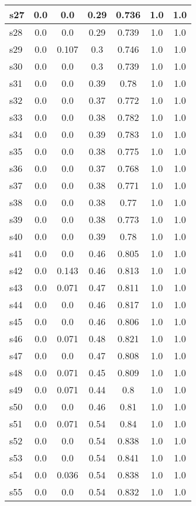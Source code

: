 \documentclass{article}
\begin{document}
\begin{tabular}{|l|c|c|c|c|c|c|}
\hline
s27 &0.0 & 0.0 & 0.29 & 0.736 & 1.0 & 1.0\\
\hline
s28 &0.0 & 0.0 & 0.29 & 0.739 & 1.0 & 1.0\\
\hline
s29 &0.0 & 0.107 & 0.3 & 0.746 & 1.0 & 1.0\\
\hline
s30 &0.0 & 0.0 & 0.3 & 0.739 & 1.0 & 1.0\\
\hline
s31 &0.0 & 0.0 & 0.39 & 0.78 & 1.0 & 1.0\\
\hline
s32 &0.0 & 0.0 & 0.37 & 0.772 & 1.0 & 1.0\\
\hline
s33 &0.0 & 0.0 & 0.38 & 0.782 & 1.0 & 1.0\\
\hline
s34 &0.0 & 0.0 & 0.39 & 0.783 & 1.0 & 1.0\\
\hline
s35 &0.0 & 0.0 & 0.38 & 0.775 & 1.0 & 1.0\\
\hline
s36 &0.0 & 0.0 & 0.37 & 0.768 & 1.0 & 1.0\\
\hline
s37 &0.0 & 0.0 & 0.38 & 0.771 & 1.0 & 1.0\\
\hline
s38 &0.0 & 0.0 & 0.38 & 0.77 & 1.0 & 1.0\\
\hline
s39 &0.0 & 0.0 & 0.38 & 0.773 & 1.0 & 1.0\\
\hline
s40 &0.0 & 0.0 & 0.39 & 0.78 & 1.0 & 1.0\\
\hline
s41 &0.0 & 0.0 & 0.46 & 0.805 & 1.0 & 1.0\\
\hline
s42 &0.0 & 0.143 & 0.46 & 0.813 & 1.0 & 1.0\\
\hline
s43 &0.0 & 0.071 & 0.47 & 0.811 & 1.0 & 1.0\\
\hline
s44 &0.0 & 0.0 & 0.46 & 0.817 & 1.0 & 1.0\\
\hline
s45 &0.0 & 0.0 & 0.46 & 0.806 & 1.0 & 1.0\\
\hline
s46 &0.0 & 0.071 & 0.48 & 0.821 & 1.0 & 1.0\\
\hline
s47 &0.0 & 0.0 & 0.47 & 0.808 & 1.0 & 1.0\\
\hline
s48 &0.0 & 0.071 & 0.45 & 0.809 & 1.0 & 1.0\\
\hline
s49 &0.0 & 0.071 & 0.44 & 0.8 & 1.0 & 1.0\\
\hline
s50 &0.0 & 0.0 & 0.46 & 0.81 & 1.0 & 1.0\\
\hline
s51 &0.0 & 0.071 & 0.54 & 0.84 & 1.0 & 1.0\\
\hline
s52 &0.0 & 0.0 & 0.54 & 0.838 & 1.0 & 1.0\\
\hline
s53 &0.0 & 0.0 & 0.54 & 0.841 & 1.0 & 1.0\\
\hline
s54 &0.0 & 0.036 & 0.54 & 0.838 & 1.0 & 1.0\\
\hline
s55 &0.0 & 0.0 & 0.54 & 0.832 & 1.0 & 1.0\\

\end{tabular}
\end{document}
